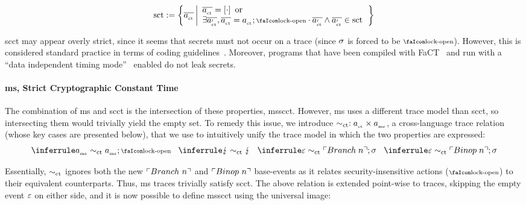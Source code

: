 \documentclass[a4paper,12pt]{article}
\begin{document}
\begin{definition}{}
  \noindent\[
  \scctsafe:=\left\{\varTrace[_{\ctsafe}] 
      \left|
        \begin{array}{l}
          \varTrace[_{\ctsafe}]=\hole{\cdot} \text{ or } \\
          \exists\varTrace[_{\ctsafe}'],\varTrace[_{\ctsafe}]=\varEvent[_{\ctsafe}];\unlock\cdot\varTrace[_{\ctsafe}'] \wedge \varTrace[_{\ctsafe}']\in\scctsafe
        \end{array}
      \right.
    \right\}
  \]
\end{definition}

\gls*{scct} may appear overly strict, since it seems that secrets must not occur on a trace (since $\varSecuritytag$ is forced to be $\unlock$). 
However, this is considered standard practice in terms of coding guidelines~\cite{ctguidelines}.
Moreover, programs that have been compiled with FaCT~\cite{cauligi2019fact} and run with a ``data independent timing mode''~\cite{arm-refman,intel-refman} enabled do not leak secrets. 

\paragraph{\gls*{ms}, Strict Cryptographic Constant Time}

The combination of \gls*{ms} and \gls*{scct} is the intersection of these properties, \gls*{msscct}.
However, \gls*{ms} uses a different trace model than \gls*{scct}, so intersecting them would trivially yield the empty set. 
To remedy this issue, we introduce $\sim_{\ctsafe}: \varEvent[_{\ctsafe}] \times \varEvent[_{\mssafe}] $, a cross-language trace relation (whose key cases are presented below), that we use to intuitively unify the trace model in which the two properties are expressed:
\[
  \typerulenolabel{}{\varEvent[_{\mssafe}]\sim_{\ctsafe}\varEvent[_{\mssafe}];\unlock{}}
  \hspace{2ex}
  \typerulenolabel{}{\lightning\sim_{\ctsafe}\lightning}
  \hspace{2ex}
  \typerulenolabel{}{\emptyevent\sim_{\ctsafe}\ev{Branch\;n};\varSecuritytag{}}
  \hspace{2ex}
  \typerulenolabel{}{\emptyevent\sim_{\ctsafe}\ev{Binop\;n};\varSecuritytag{}}
\]

Essentially, $\sim_{\ctsafe}$ ignores both the new $\ev{Branch\ n}$ and $\ev{Binop\ n}$ base-events as it relates security-insensitive actions ($\unlock$) to their equivalent counterparts.
Thus, \gls*{ms} traces trivially satisfy \gls*{scct}.
% 
The above relation is extended point-wise to traces, skipping the empty event $\emptyevent$ on either side, and it is now possible to define \gls*{msscct} using the universal image:
\end{document}
